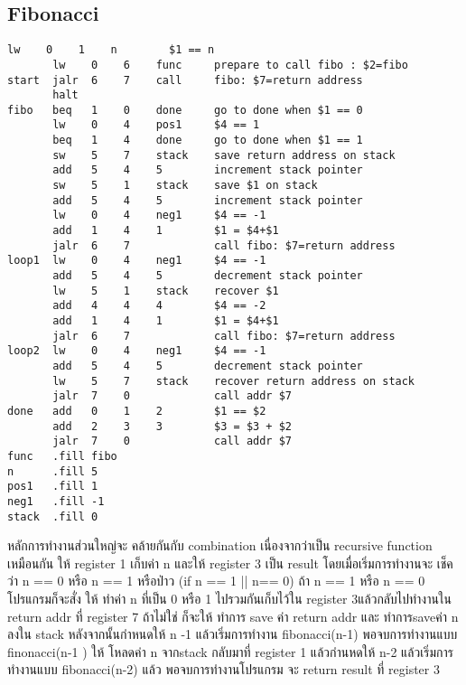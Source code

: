 \documentclass[14pt]{article}
\begin{document}
\subsection{Fibonacci}
\begin{lstlisting}[style=assembly]
       lw    0    1    n        $1 == n     
       lw    0    6    func     prepare to call fibo : $2=fibo 
start  jalr  6    7    call     fibo: $7=return address
       halt
fibo   beq   1    0    done     go to done when $1 == 0
       lw    0    4    pos1     $4 == 1
       beq   1    4    done     go to done when $1 == 1
       sw    5    7    stack    save return address on stack
       add   5    4    5        increment stack pointer
       sw    5    1    stack    save $1 on stack
       add   5    4    5        increment stack pointer
       lw    0    4    neg1     $4 == -1
       add   1    4    1        $1 = $4+$1
       jalr  6    7             call fibo: $7=return address
loop1  lw    0    4    neg1     $4 == -1
       add   5    4    5        decrement stack pointer
       lw    5    1    stack    recover $1
       add   4    4    4        $4 == -2
       add   1    4    1        $1 = $4+$1
       jalr  6    7             call fibo: $7=return address
loop2  lw    0    4    neg1     $4 == -1
       add   5    4    5        decrement stack pointer
       lw    5    7    stack    recover return address on stack
       jalr  7    0             call addr $7
done   add   0    1    2        $1 == $2
       add   2    3    3        $3 = $3 + $2
       jalr  7    0             call addr $7
func   .fill fibo
n      .fill 5
pos1   .fill 1
neg1   .fill -1
stack  .fill 0   
\end{lstlisting}
\par หลักการทำงานส่วนใหญ่จะ คล้ายกันกับ combination เนื่องจากว่าเป็น recursive function เหมือนกัน 
ให้ register 1 เก็บค่า n   และให้ register 3 เป็น result 
โดยเมื่อเริ่มการทำงานจะ เช็คว่า n ==  0 หรือ n == 1  หรือป่าว (if n == 1 || n== 0)
ถ้า n == 1 หรือ n == 0 โปรแกรมก็จะสั่ง ให้ ทำค่า n ที่เป็น 0 หรือ 1 ไปรวมกันเก็บไว้ใน register 3แล้วกลับไปทำงานใน return addr ที่ register 7 
ถ้าไม่ใช่ ก็จะให้ ทำการ save ค่า return addr และ ทำการsaveค่า n ลงใน stack หลังจากนั้นกำหนดให้ n -1 แล้วเริ่มการทำงาน fibonacci(n-1)
พอจบการทำงานแบบ finonacci(n-1 ) ให้ โหลดค่า n จากstack กลับมาที่ register 1 แล้วกำนหดให้ n-2 แล้วเริ่มการทำงานแบบ fibonacci(n-2) 
แล้ว พอจบการทำงานโปรแกรม จะ return result ที่ register 3 

\newpage
\vspace*{\fill}
\noindent
{}
\end{document}
